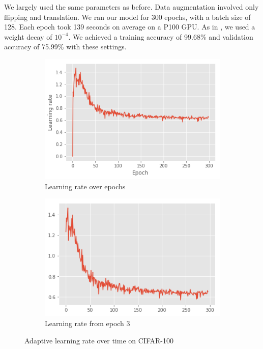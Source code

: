 \documentclass{article}
\begin{document}
We largely used the same parameters as before. Data augmentation involved only flipping and translation. We ran our model for 300 epochs, with a batch size of 128. Each epoch took 139 seconds on average on a P100 GPU. As in \cite{he2016identity}, we used a weight decay of $10^{-4}$. We achieved a training accuracy of 99.68\% and validation accuracy of 75.99\% with these settings.

\begin{figure}
    \centering
    \begin{subfigure}[b]{0.4\textwidth}
        \includegraphics[width=\linewidth]{cifar100-lr-full.png}
        \caption{Learning rate over epochs}
        \label{fig:cifar100:1a}
    \end{subfigure}
    \begin{subfigure}[b]{0.4\textwidth}
        \includegraphics[width=\linewidth]{cifar100-lr-3.png}
        \caption{Learning rate from epoch 3}
        \label{fig:cifar100:1b}
    \end{subfigure}
    \caption{Adaptive learning rate over time on CIFAR-100}
    \label{fig:cifar100:1}
\end{figure}
\end{document}
